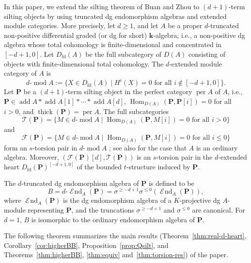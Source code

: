 \documentclass[11pt,a4paper,reqno]{amsart}
\theoremstyle{plain}
\numberwithin{equation}{section}
\theoremstyle{definition}
\providecommand{\add}{\operatorname{add}}
\providecommand{\per}{\operatorname{per}}
\providecommand{\thick}{\operatorname{thick}}
\renewcommand{\mod}{\operatorname{mod}}
\newcommand{\Hom}{\operatorname{Hom}}
\renewcommand{\k}{\mathbf{k}}
\DeclareMathOperator{\huaEnd}{\mathcal{E}\!nd}
\newcommand{\emod}[2]{#1\text{-}\!\mod #2}
\newcommand{\eheart}[2]{#2^{[-#1+1,0]}}
\newcommand{\eend}[2]{#1\text{-}\huaEnd_{#2}}
\newcommand{\PP}{\mathbf{P}}
\newcommand{\T}{\mathcal{T}}
\newcommand{\F}{\mathcal{F}}
\begin{document}
In this paper, we extend the silting theorem of Buan and Zhou to $(d+1)$-term silting objects by using truncated dg endomorphism algebras and extended module categories. More precisely, let $d\geq1$, and let $A$ be a proper $d$-truncated non-positive differential graded (or dg for short) $\k$-algebra, i.e., a non-positive dg algebra whose total cohomology is finite-dimensional and concentrated in $[-d+1,0]$. Let $D_{\mathrm{fd}}(A)$ be the full subcategory of $D(A)$ consisting of objects with finite-dimensional total cohomology. The $d$-extended module category of $A$ is
\[
 \emod{d}{A}
 :=\{X\in D_{\mathrm{fd}}(A)\mid
       H^i(X)=0\text{ for all }i\notin[-d+1,0]\}.
\]
Let $\PP$ be a $(d+1)$-term silting object in the perfect category $\per A$ of $A$, i.e., $\PP\in\add A*\add A[1]*\cdots*\add A[d]$, $\Hom_{D(A)}(\PP,\PP[i])=0$ for all $i>0$, and $\thick(\PP)=\per A$. The full subcategories
\[\T(\PP)=\{M\in\emod{d}{ A}\mid\Hom_{D(A)}(\PP,M[i])=0\text{ for all }i>0\}\]
and
\[\F(\PP)=\{M\in\emod{d}{ A}\mid\Hom_{D(A)}(\PP,M[i])=0\text{ for all }i\leq0\}\]
form an $s$-torsion pair in $\emod{d}{A}$ \cite[Corollary~4.1]{HZ}; see also \cite{G,Z} for the case that $A$ is an ordinary algebra. Moreover, $(\F(\PP)[d],\T(\PP))$ is an $s$-torsion pair in the $d$-extended heart $\eheart{d}{D_{\mathrm{fd}}(\PP)}$ of the bounded $t$-structure induced by $\PP$.

The $d$-truncated dg endomorphism algebra of $\PP$ is defined to be
\[B=\eend{d}{A}(\PP)=\sigma^{\geq -d+1}\sigma^{\leq 0}\left(\huaEnd_A(\PP)\right),\]
where $\huaEnd_A(\PP)$ is the dg endomorphism algebra of a $K$-projective dg $A$-module representing $\PP$, and the truncations $\sigma^{\geq -d+1}$ and $\sigma^{\leq 0}$ are canonical. For $d=1$, $B$ is isomorphic to the ordinary endomorphism algebra of $\PP$. 

The following theorem summarizes the main results (Theorem~\ref{thm:real-d-heart}, Corollary~\ref{cor:higherBB}, Proposition~\ref{prop:Qsilt}, and Theorems~\ref{thm:higherBB}, \ref{thm:equiv} and~\ref{thm:torsion-res}) of the paper.
\end{document}
